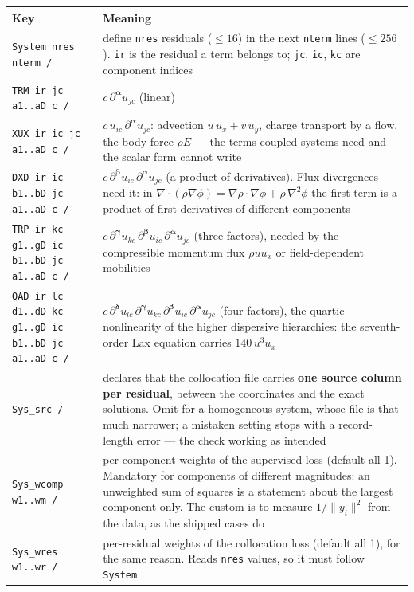 \documentclass[10pt,a4paper]{article}
\newcommand{\code}[1]{\texttt{#1}}
\newcommand{\mi}[1]{\boldsymbol{#1}}
\begin{document}
\begin{longtable}{@{}p{}p{}@{}}
\toprule
Key & Meaning \\
\midrule
\endhead
\code{System nres nterm /} & define \code{nres} residuals ($\le 16$) in the next \code{nterm} lines ($\le 256$). \code{ir} is the residual a term belongs to; \code{jc}, \code{ic}, \code{kc} are component indices\\
\code{TRM ir jc a1..aD c /} & $c\,\partial^{\mi\alpha}u_{jc}$ (linear)\\
\code{XUX ir ic jc a1..aD c /} & $c\,u_{ic}\,\partial^{\mi\alpha}u_{jc}$: advection $u\,u_x+v\,u_y$, charge transport by a flow, the body force $\rho E$ --- the terms coupled systems need and the scalar form cannot write\\
\code{DXD ir ic b1..bD jc a1..aD c /} & $c\,\partial^{\mi\beta}u_{ic}\,\partial^{\mi\alpha}u_{jc}$ (a product of derivatives). Flux divergences need it: in $\nabla\!\cdot\!(\rho\nabla\phi)=\nabla\rho\!\cdot\!\nabla\phi+\rho\,\nabla^2\phi$ the first term is a product of first derivatives of different components\\
\code{TRP ir kc g1..gD ic b1..bD jc a1..aD c /} & $c\,\partial^{\mi\gamma}u_{kc}\,\partial^{\mi\beta}u_{ic}\,\partial^{\mi\alpha}u_{jc}$ (three factors), needed by the compressible momentum flux $\rho u u_x$ or field-dependent mobilities\\
\code{QAD ir lc d1..dD kc g1..gD ic b1..bD jc a1..aD c /} & $c\,\partial^{\mi\delta}u_{lc}\,\partial^{\mi\gamma}u_{kc}\,\partial^{\mi\beta}u_{ic}\,\partial^{\mi\alpha}u_{jc}$ (four factors), the quartic nonlinearity of the higher dispersive hierarchies: the seventh-order Lax equation carries $140\,u^3u_x$\\
\code{Sys\_src /} & declares that the collocation file carries \textbf{one source column per residual}, between the coordinates and the exact solutions. Omit for a homogeneous system, whose file is that much narrower; a mistaken setting stops with a record-length error --- the check working as intended\\
\code{Sys\_wcomp w1..wm /} & per-component weights of the supervised loss (default all 1). Mandatory for components of different magnitudes: an unweighted sum of squares is a statement about the largest component only. The custom is to measure $1/\lVert y_i\rVert^2$ from the data, as the shipped cases do\\
\code{Sys\_wres w1..wr /} & per-residual weights of the collocation loss (default all 1), for the same reason. Reads \code{nres} values, so it must follow \code{System}\\

\end{longtable}
\end{document}
